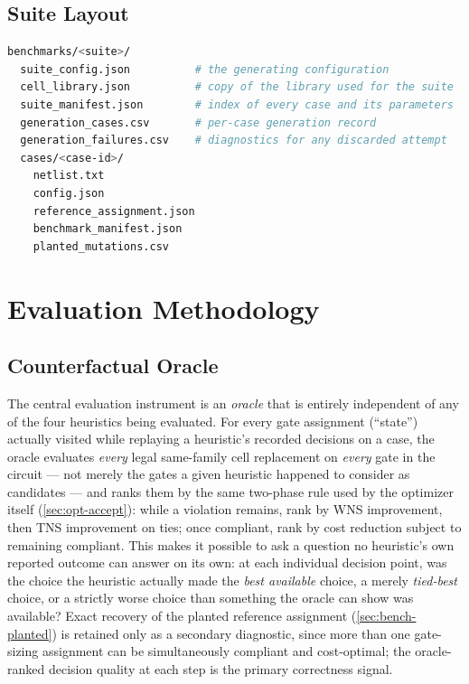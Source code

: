 \subsection{Suite Layout}
\label{sec:bench-layout}

\begin{lstlisting}[language=bash, style=pythonstyle, numbers=none]
benchmarks/<suite>/
  suite_config.json          # the generating configuration
  cell_library.json          # copy of the library used for the suite
  suite_manifest.json        # index of every case and its parameters
  generation_cases.csv       # per-case generation record
  generation_failures.csv    # diagnostics for any discarded attempt
  cases/<case-id>/
    netlist.txt
    config.json
    reference_assignment.json
    benchmark_manifest.json
    planted_mutations.csv
\end{lstlisting}

\section{Evaluation Methodology}
\label{sec:bench-evaluation}

\subsection{Counterfactual Oracle}
\label{sec:bench-oracle}

The central evaluation instrument is an \emph{oracle} that is entirely
independent of any of the four heuristics being evaluated. For every gate
assignment (``state'') actually visited while replaying a heuristic's
recorded decisions on a case, the oracle evaluates \emph{every} legal
same-family cell replacement on \emph{every} gate in the circuit --- not
merely the gates a given heuristic happened to consider as candidates ---
and ranks them by the same two-phase rule used by the optimizer itself
(\cref{sec:opt-accept}): while a violation remains, rank by WNS
improvement, then TNS improvement on ties; once compliant, rank by cost
reduction subject to remaining compliant. This makes it possible to ask a
question no heuristic's own reported outcome can answer on its own: at each
individual decision point, was the choice the heuristic actually made the
\emph{best available} choice, a merely \emph{tied-best} choice, or a
strictly worse choice than something the oracle can show was available?
Exact recovery of the planted reference assignment
(\cref{sec:bench-planted}) is retained only as a secondary diagnostic,
since more than one gate-sizing assignment can be simultaneously compliant
and cost-optimal; the oracle-ranked decision quality at each step is the
primary correctness signal.

